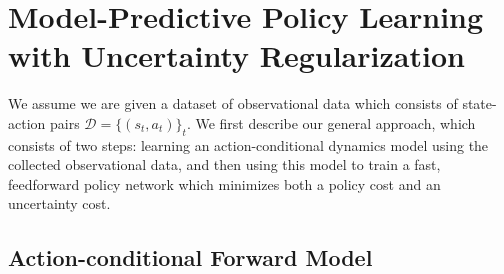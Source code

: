 \documentclass{article} %
\begin{document}

\section{Model-Predictive Policy Learning with Uncertainty Regularization}

We assume we are given a dataset of observational data which consists of state-action pairs $\mathcal{D} = \{(s_t, a_t)\}_t$.
We first describe our general approach, which consists of two steps: learning an action-conditional dynamics model using the collected observational data, and then using this model to train a fast, feedforward policy network which minimizes both a policy cost and an uncertainty cost. 

\subsection{Action-conditional Forward Model}
\end{document}
